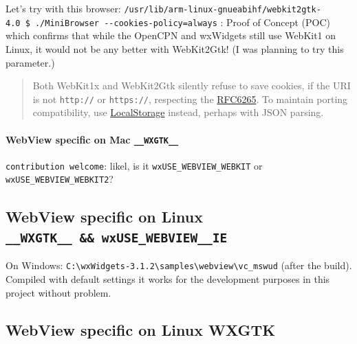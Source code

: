 \documentclass[11pt]{article}
\begin{document}
    Let's try with this browser:
\texttt{/usr/lib/arm-linux-gnueabihf/webkit2gtk-4.0\ \$\ ./MiniBrowser\ -\/-cookies-policy=always}
: Proof of Concept (POC) which confirms that while the OpenCPN and
wxWidgets still use WebKit1 on Linux, it would not be any better with
WebKit2Gtk! (I was planning to try this parameter.)

    \begin{quote}
Both WebKit1x and WebKit2Gtk silently refuse to save cookies, if the URI
is not \texttt{http://} or \texttt{https://}, respecting the
\href{https://tools.ietf.org/html/rfc6265}{RFC6265}. To maintain porting
compatibility, use
\href{https://developer.mozilla.org/en-US/docs/Web/API/Window/localStorage}{LocalStorage}
instead, perhaps with JSON parsing.
\end{quote}

    \hypertarget{webview-specific-on-mac-__wxgtk__}{%
\paragraph{\texorpdfstring{WebView specific on Mac
\texttt{\_\_WXGTK\_\_}}{WebView specific on Mac \_\_WXGTK\_\_}}\label{webview-specific-on-mac-__wxgtk__}}

    \texttt{contribution\ welcome}: likel, is it
\texttt{wxUSE\_WEBVIEW\_WEBKIT} or \texttt{wxUSE\_WEBVIEW\_WEBKIT2}?

    \hypertarget{webview-specific-on-linux-__wxgtk__-wxuse_webview__ie}{%
\subsection{\texorpdfstring{WebView specific on Linux
\texttt{\_\_WXGTK\_\_\ \&\&\ wxUSE\_WEBVIEW\_\_IE}}{WebView specific on Linux \_\_WXGTK\_\_ \&\& wxUSE\_WEBVIEW\_\_IE}}\label{webview-specific-on-linux-__wxgtk__-wxuse_webview__ie}}

    On Windows:
\texttt{C:\textbackslash{}wxWidgets-3.1.2\textbackslash{}samples\textbackslash{}webview\textbackslash{}vc\_mswud}
(after the build). Compiled with default settings it works for the
development purposes in this project without problem.

    \hypertarget{webview-specific-on-linux-wxgtk}{%
\subsection{\texorpdfstring{WebView specific on Linux
\textbf{WXGTK}}{WebView specific on Linux WXGTK}}\label{webview-specific-on-linux-wxgtk}}
\end{document}

